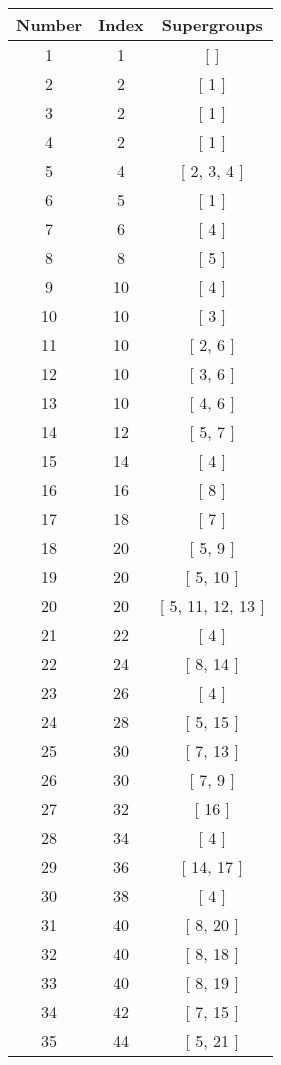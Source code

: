 \begin{center}
\begin{longtable}[H]{|| c c c ||}
\hline
Number & Index & Supergroups \\ 
\hline
1 & 1 & [ ] \\ 
\hline
2 & 2 & [ 1 ] \\ 
\hline
3 & 2 & [ 1 ] \\ 
\hline
4 & 2 & [ 1 ] \\ 
\hline
5 & 4 & [ 2, 3, 4 ] \\ 
\hline
6 & 5 & [ 1 ] \\ 
\hline
7 & 6 & [ 4 ] \\ 
\hline
8 & 8 & [ 5 ] \\ 
\hline
9 & 10 & [ 4 ] \\ 
\hline
10 & 10 & [ 3 ] \\ 
\hline
11 & 10 & [ 2, 6 ] \\ 
\hline
12 & 10 & [ 3, 6 ] \\ 
\hline
13 & 10 & [ 4, 6 ] \\ 
\hline
14 & 12 & [ 5, 7 ] \\ 
\hline
15 & 14 & [ 4 ] \\ 
\hline
16 & 16 & [ 8 ] \\ 
\hline
17 & 18 & [ 7 ] \\ 
\hline
18 & 20 & [ 5, 9 ] \\ 
\hline
19 & 20 & [ 5, 10 ] \\ 
\hline
20 & 20 & [ 5, 11, 12, 13 ] \\ 
\hline
21 & 22 & [ 4 ] \\ 
\hline
22 & 24 & [ 8, 14 ] \\ 
\hline
23 & 26 & [ 4 ] \\ 
\hline
24 & 28 & [ 5, 15 ] \\ 
\hline
25 & 30 & [ 7, 13 ] \\ 
\hline
26 & 30 & [ 7, 9 ] \\ 
\hline
27 & 32 & [ 16 ] \\ 
\hline
28 & 34 & [ 4 ] \\ 
\hline
29 & 36 & [ 14, 17 ] \\ 
\hline
30 & 38 & [ 4 ] \\ 
\hline
31 & 40 & [ 8, 20 ] \\ 
\hline
32 & 40 & [ 8, 18 ] \\ 
\hline
33 & 40 & [ 8, 19 ] \\ 
\hline
34 & 42 & [ 7, 15 ] \\ 
\hline
35 & 44 & [ 5, 21 ] \\ 

\end{longtable}
\end{center}
